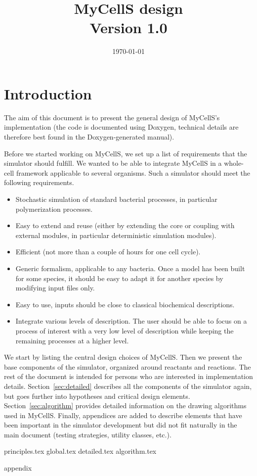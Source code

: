 \documentclass[12pt]{scrartcl}
\theoremstyle{definition}
\theoremstyle{remark}
\numberwithin{equation}{section}
\begin{document}
\title{MyCellS design \\ Version 1.0}%
\date{\today}%
\maketitle

\newpage

\tableofcontents

\newpage

\section{Introduction}

The aim of this document is to present the general design of MyCellS's implementation
(the code is documented using Doxygen, technical details are therefore best found in the Doxygen-generated manual).

Before we started working on MyCellS,
we set up a list of requirements that the simulator should fulfill.
We wanted to be able to integrate MyCellS in a whole-cell framework
applicable to several organisms.
Such a simulator should meet the following requirements.
\begin{itemize}
  \item Stochastic simulation of standard bacterial processes,
  in particular polymerization processes.
  \item Easy to extend and reuse
  (either by extending the core or coupling with external modules,
  in particular deterministic simulation modules).
  \item Efficient (not more than a couple of hours for one cell cycle).
  \item Generic formalism, applicable to any bacteria.
  Once a model has been built for some species, it should be easy to adapt it
  for another species by modifying input files only.
  \item Easy to use, inputs should be close to classical biochemical
  descriptions.
  \item Integrate various levels of description.
  The user should be able to focus on a process of interest
  with a very low level of description
  while keeping the remaining processes at a higher level.
\end{itemize}

We start by listing the central design choices of MyCellS.
Then we present the base components of the simulator, organized around reactants and reactions.
The rest of the document is intended for persons who are interested in implementation details.
Section~\ref{sec:detailed} describes all the components of the simulator again,
but goes further into hypotheses and critical design elements.
Section~\ref{sec:algorithm} provides detailed information
on the drawing algorithms used in MyCellS.
Finally, appendices are added to describe elements that have been important
in the simulator development but did not fit naturally in the main document
(testing strategies, utility classes, etc.).

{principles.tex}
{global.tex}
{detailed.tex}
{algorithm.tex}
\clearpage

\appendix
{appendix}
\clearpage



\end{document}

